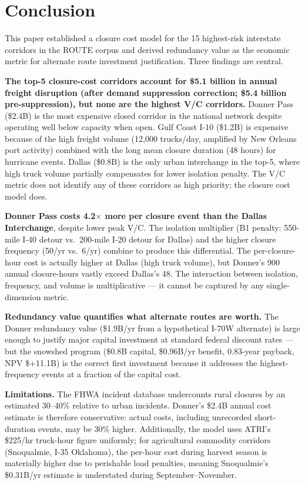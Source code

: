 \section{Conclusion}

This paper established a closure cost model for the 15 highest-risk interstate corridors
in the ROUTE corpus and derived redundancy value as the economic metric for alternate
route investment justification. Three findings are central.

\textbf{The top-5 closure-cost corridors account for \$5.1 billion in annual freight
disruption (after demand suppression correction; \$5.4 billion pre-suppression), but none are the highest V/C corridors.} Donner Pass (\$2.4B) is the most
expensive closed corridor in the national network despite operating well below capacity
when open. Gulf Coast I-10 (\$1.2B) is expensive because of the high freight volume
(12,000 trucks/day, amplified by New Orleans port activity) combined with the long
mean closure duration (48 hours) for hurricane events. Dallas (\$0.8B) is the only
urban interchange in the top-5, where high truck volume partially compensates for lower
isolation penalty. The V/C metric does not identify any of these corridors as high
priority; the closure cost model does.

\textbf{Donner Pass costs 4.2$\times$ more per closure event than the Dallas
Interchange}, despite lower peak V/C. The isolation multiplier (B1 penalty: 550-mile
I-40 detour vs.\ 200-mile I-20 detour for Dallas) and the higher closure frequency
(50/yr vs.\ 6/yr) combine to produce this differential. The per-closure-hour cost
is actually higher at Dallas (high truck volume), but Donner's 900 annual closure-hours
vastly exceed Dallas's 48. The interaction between isolation, frequency, and volume
is multiplicative --- it cannot be captured by any single-dimension metric.

\textbf{Redundancy value quantifies what alternate routes are worth.} The Donner
redundancy value (\$1.9B/yr from a hypothetical I-70W alternate) is large enough to
justify major capital investment at standard federal discount rates --- but the snowshed
program (\$0.8B capital, \$0.96B/yr benefit, 0.83-year payback, NPV \$+11.1B) is
the correct first investment because it addresses the highest-frequency events at a
fraction of the capital cost.

\textbf{Limitations.} The FHWA incident database undercounts rural closures by an
estimated 30--40\% relative to urban incidents. Donner's \$2.4B annual cost estimate
is therefore conservative: actual costs, including unrecorded short-duration events,
may be 30\% higher. Additionally, the model uses ATRI's \$225/hr truck-hour figure
uniformly; for agricultural commodity corridors (Snoqualmie, I-35 Oklahoma), the
per-hour cost during harvest season is materially higher due to perishable load
penalties, meaning Snoqualmie's \$0.31B/yr estimate is understated during
September--November.

